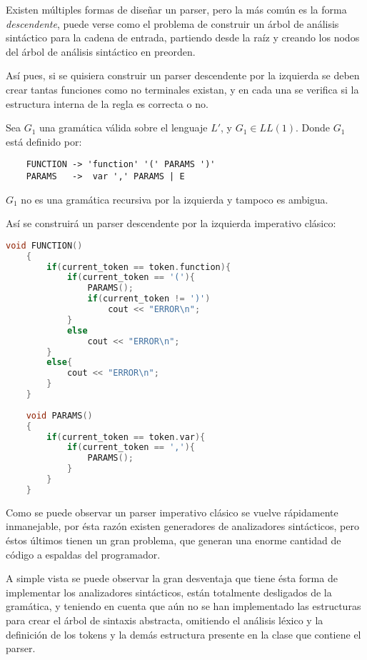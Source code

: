 Existen múltiples formas de diseñar un parser, pero la más común es la forma \emph{descendente}, puede verse como el problema de construir un árbol de análisis sintáctico para la cadena de entrada, partiendo desde la raíz y creando los nodos del árbol de análisis sintáctico en preorden.\cite{Dragon}

Así pues, si se quisiera construir un parser descendente por la izquierda se deben crear tantas funciones como no terminales existan, y en cada una se verifica si la estructura interna de la regla es correcta o no.

\begin{exmp}
	Sea $G_1$ una gramática válida sobre el lenguaje $L'$, y $G_1 \in LL(1)$.
	Donde $G_1$ está definido por:
		
	\begin{lstlisting}
	FUNCTION -> 'function' '(' PARAMS ')'
	PARAMS   ->  var ',' PARAMS | E
	\end{lstlisting}
	
	$G_1$ no es una gramática recursiva por la izquierda y tampoco es ambigua.
	
	Así se construirá un parser descendente por la izquierda imperativo clásico:
	\begin{lstlisting}[language=C++, caption=Parser imperativo]
	void FUNCTION()
	{
		if(current_token == token.function){
			if(current_token == '('){
				PARAMS();
				if(current_token != ')')
					cout << "ERROR\n";
			}
			else
				cout << "ERROR\n";
		}
		else{
			cout << "ERROR\n";
		}
	}
	
	void PARAMS()
	{
		if(current_token == token.var){
			if(current_token == ','){
				PARAMS();
			}
		}
	}
	\end{lstlisting}
\end{exmp}

	Como se puede observar un parser imperativo clásico se vuelve rápidamente inmanejable, por ésta razón existen generadores de analizadores sintácticos, pero éstos últimos tienen un gran problema, que generan una enorme cantidad de código a espaldas del programador.
	
	A simple vista se puede observar la gran desventaja que tiene ésta forma de implementar los analizadores sintácticos, están totalmente desligados de la gramática, y teniendo en cuenta que aún no se han implementado las estructuras para crear el árbol de sintaxis abstracta, omitiendo el análisis léxico y la definición de los tokens y la demás estructura presente en la clase que contiene el parser.


